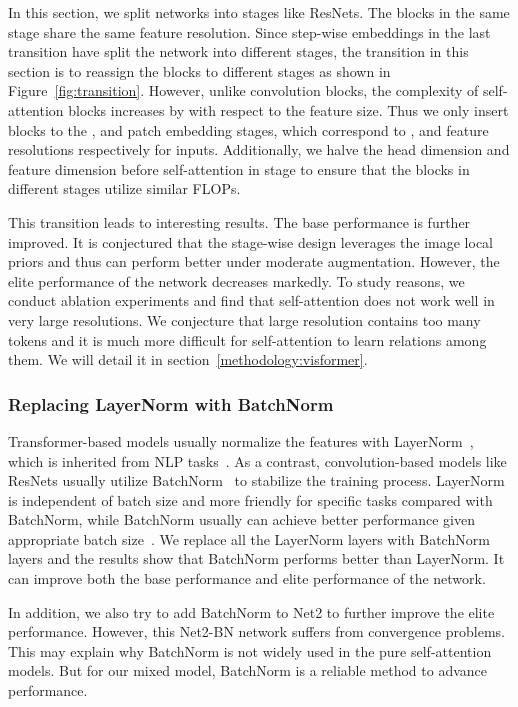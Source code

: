 \documentclass[10pt,twocolumn,letterpaper]{article}
\begin{document}
In this section, we split networks into stages like ResNets. The blocks in the same stage share the same feature resolution. Since step-wise embeddings in the last transition have split the network into different stages, the transition in this section is to reassign the blocks to different stages as shown in Figure~\ref{fig:transition}. However, unlike convolution blocks, the complexity of self-attention blocks increases by  with respect to the feature size. Thus we only insert blocks to the ,  and  patch embedding stages, which correspond to ,  and  feature resolutions respectively for  inputs. Additionally, we halve the head dimension and feature dimension before self-attention in  stage to ensure that the blocks in different stages utilize similar FLOPs.

This transition leads to interesting results. The base performance is further improved. It is conjectured that the stage-wise design leverages the image local priors and thus can perform better under moderate augmentation. However, the elite performance of the network decreases markedly. To study reasons, we conduct ablation experiments and find that self-attention does not work well in very large resolutions. We conjecture that large resolution contains too many tokens and it is much more difficult for self-attention to learn relations among them. We will detail it in section~\ref{methodology:visformer}.

\subsubsection{Replacing LayerNorm with BatchNorm}
\label{methodology:transition:norm}

Transformer-based models usually normalize the features with LayerNorm~\cite{ba2016layer}, which is inherited from NLP tasks~\cite{vaswani2017attention, devlin2018bert}. As a contrast, convolution-based models like ResNets usually utilize BatchNorm~\cite{ioffe2015batch} to stabilize the training process.
LayerNorm is independent of batch size and more friendly for specific tasks compared with BatchNorm, while BatchNorm usually can achieve better performance given appropriate batch size~\cite{wu2018group}. 
We replace all the LayerNorm layers with BatchNorm layers and the results show that BatchNorm performs better than LayerNorm. It can improve both the base performance and elite performance of the network. 

In addition, we also try to add BatchNorm to Net2 to further improve the elite performance. However, this Net2-BN network suffers from convergence problems. This may explain why BatchNorm is not widely used in the pure self-attention models. But for our mixed model, BatchNorm is a reliable method to advance performance.
\end{document}

